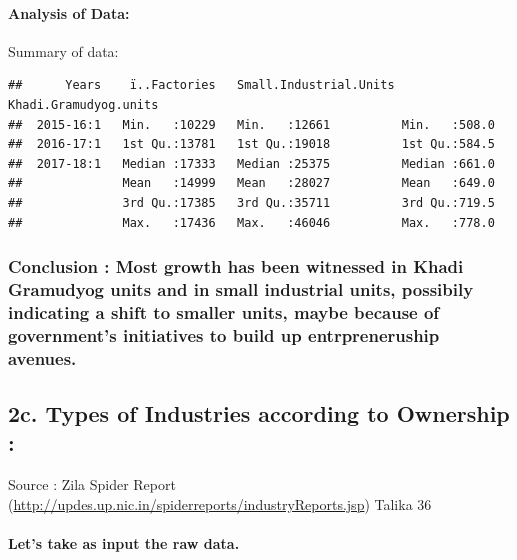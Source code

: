 \documentclass[]{article}
\let\oldparagraph\paragraph
\renewcommand{\paragraph}[1]{\oldparagraph{#1}\mbox{}}
\begin{document}
\paragraph{Analysis of Data:}\label{analysis-of-data-1}

Summary of data:

\begin{verbatim}
##      Years    ï..Factories   Small.Industrial.Units Khadi.Gramudyog.units
##  2015-16:1   Min.   :10229   Min.   :12661          Min.   :508.0        
##  2016-17:1   1st Qu.:13781   1st Qu.:19018          1st Qu.:584.5        
##  2017-18:1   Median :17333   Median :25375          Median :661.0        
##              Mean   :14999   Mean   :28027          Mean   :649.0        
##              3rd Qu.:17385   3rd Qu.:35711          3rd Qu.:719.5        
##              Max.   :17436   Max.   :46046          Max.   :778.0
\end{verbatim}

\subsubsection{\texorpdfstring{\textbf{Conclusion} : Most growth has
been witnessed in Khadi Gramudyog units and in small industrial units,
possibily indicating a shift to smaller units, maybe because of
government's initiatives to build up entrpreneruship
avenues.}{Conclusion : Most growth has been witnessed in Khadi Gramudyog units and in small industrial units, possibily indicating a shift to smaller units, maybe because of government's initiatives to build up entrpreneruship avenues.}}\label{conclusion-most-growth-has-been-witnessed-in-khadi-gramudyog-units-and-in-small-industrial-units-possibily-indicating-a-shift-to-smaller-units-maybe-because-of-governments-initiatives-to-build-up-entrpreneruship-avenues.}

\subsection{2c. Types of Industries according to Ownership
:}\label{c.-types-of-industries-according-to-ownership}

Source : Zila Spider Report
(\url{http://updes.up.nic.in/spiderreports/industryReports.jsp}) Talika
36

\paragraph{Let's take as input the raw
data.}\label{lets-take-as-input-the-raw-data.-2}
\end{document}
